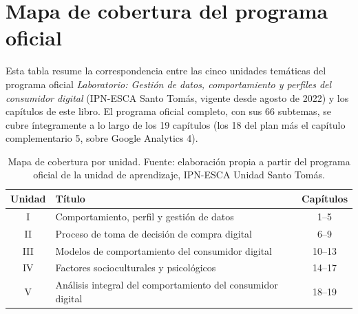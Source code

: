 
\chapter*{Mapa de cobertura del programa oficial}

Esta tabla resume la correspondencia entre las cinco unidades temáticas del
programa oficial \textit{Laboratorio: Gestión de datos, comportamiento y
perfiles del consumidor digital} (IPN-ESCA Santo Tomás, vigente desde agosto de
2022) y los capítulos de este libro. El programa oficial completo, con sus 66
subtemas, se cubre íntegramente a lo largo de los 19 capítulos (los 18 del plan más el capítulo complementario 5, sobre Google Analytics 4).

\begin{table}[htbp]
\centering
\begin{tabular}{@{}clc@{}}
\toprule
Unidad & Título & Capítulos \\
\midrule
I   & Comportamiento, perfil y gestión de datos & 1--5 \\
II  & Proceso de toma de decisión de compra digital & 6--9 \\
III & Modelos de comportamiento del consumidor digital & 10--13 \\
IV  & Factores socioculturales y psicológicos & 14--17 \\
V   & Análisis integral del comportamiento del consumidor digital & 18--19 \\
\bottomrule
\end{tabular}
\caption{Mapa de cobertura por unidad. Fuente: elaboración propia a partir del
programa oficial de la unidad de aprendizaje, IPN-ESCA Unidad Santo Tomás.}
\label{tab:mapa-cobertura}
\end{table}

